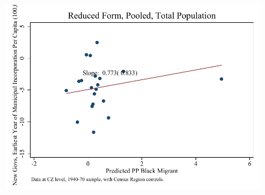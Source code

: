 \documentclass{article}
\begin{document}
\begin{figure}
\centering
\includegraphics{figures/simplefigs/pooled_cgoodman_pc_C3_total_rf.pdf}
\end{figure}
\clearpage
\end{document}
